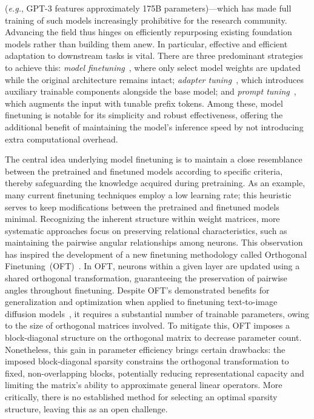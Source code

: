 (\emph{e.g.}, GPT-3 features approximately 175B parameters)—which has made full training of such models increasingly prohibitive for the research community. Advancing the field thus hinges on efficiently repurposing existing foundation models rather than building them anew. In particular, effective and efficient adaptation to downstream tasks is vital. There are three predominant strategies to achieve this: \emph{model finetuning}~\cite{hulora2022,zaken2022bitfit,guo2020parameter,raffel2020exploring,qiu2023controlling,zhang2022adaptive,chavan2023one}, where only select model weights are updated while the original architecture remains intact; \emph{adapter tuning}~\cite{rebuffi2017learning,houlsby2019parameter,pfeiffer2020adapterfusion,lin2020exploring,he2021towards}, which introduces auxiliary trainable components alongside the base model; and \emph{prompt tuning}~\cite{li2021prefix,lester2021power}, which augments the input with tunable prefix tokens. Among these, model finetuning is notable for its simplicity and robust effectiveness, offering the additional benefit of maintaining the model's inference speed by not introducing extra computational overhead.

The central idea underlying model finetuning is to maintain a close resemblance between the pretrained and finetuned models according to specific criteria, thereby safeguarding the knowledge acquired during pretraining. As an example, many current finetuning techniques employ a low learning rate; this heuristic serves to keep modifications between the pretrained and finetuned models minimal. Recognizing the inherent structure within weight matrices, more systematic approaches focus on preserving relational characteristics, such as maintaining the pairwise angular relationships among neurons. This observation has inspired the development of a new finetuning methodology called Orthogonal Finetuning~(OFT)~\cite{qiu2023controlling}. In OFT, neurons within a given layer are updated using a shared orthogonal transformation, guaranteeing the preservation of pairwise angles throughout finetuning. Despite OFT's demonstrated benefits for generalization and optimization when applied to finetuning text-to-image diffusion models~\cite{qiu2023controlling}, it requires a substantial number of trainable parameters, owing to the size of orthogonal matrices involved. To mitigate this, OFT imposes a block-diagonal structure on the orthogonal matrix to decrease parameter count. Nonetheless, this gain in parameter efficiency brings certain drawbacks: the imposed block-diagonal sparsity constrains the orthogonal transformation to fixed, non-overlapping blocks, potentially reducing representational capacity and limiting the matrix’s ability to approximate general linear operators. More critically, there is no established method for selecting an optimal sparsity structure, leaving this as an open challenge.

